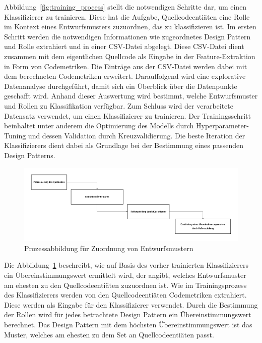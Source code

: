 Abbildung~\ref{fig:training_process} stellt die notwendigen Schritte dar, um einen Klassifizierer zu trainieren. Diese hat die Aufgabe,
Quellcodeentiäten eine Rolle im Kontext eines Entwurfsmusters zuzuordnen, das zu klassifizieren ist. Im ersten Schritt werden die notwendigen Informationen wie zugeordnetes Design Pattern und Rolle extrahiert und in einer CSV-Datei abgelegt. 
Diese CSV-Datei dient zusammen mit dem eigentlichen Quellcode als Eingabe in der Feature-Extraktion in Form von Codemetriken. Die Einträge aus der CSV-Datei werden dabei mit dem berechneten Codemetriken erweitert.
Darauffolgend wird eine explorative Datenanalyse durchgeführt, damit sich ein Überblick über die Datenpunkte geschafft wird. Anhand dieser Auswertung wird bestimmt, welche Entwurfsmuster und Rollen zu Klassifikation verfügbar.
Zum Schluss wird der verarbeitete Datensatz verwendet, um einen Klassifizierer zu trainieren. Der Trainingsschritt beinhaltet unter anderem die Optimierung des Modells durch Hyperparameter-Tuning und dessen Validation durch Kreuzvalidierung.
Die beste Iteration der Klassifizierers dient dabei als Grundlage bei der Bestimmung eines passenden Design Patterns.


\begin{figure}[h]
    \centering
    \includegraphics[scale=0.5]{figures/pattern_matching_overvierw.png}
    \caption{Prozessabbildung für Zuordnung von Entwurfsmustern}
    \label{fig:pattern_matching_overview}
\end{figure}

Die Abbildung~\ref{fig:pattern_matching_overview} beschreibt, wie auf Basis des vorher trainierten Klassifizierers ein Übereinstimmungswert ermittelt wird, der angibt,
welches Entwurfsmuster am ehesten zu den Quellcodeentiäten zuzuordnen ist. Wie im Trainingsprozess des Klassifizierers werden von den Quellcodeentiäten Codemetriken extrahiert.
Diese werden als Eingabe für den Klassifizierer verwendet. Durch die Bestimmung der Rollen wird für jedes betrachtete Design Pattern ein Übereinstimmungswert berechnet.
Das Design Pattern mit dem höchsten Übereinstimmungswert ist das Muster, welches am ehesten zu dem Set an Quellcodeentiäten passt.

